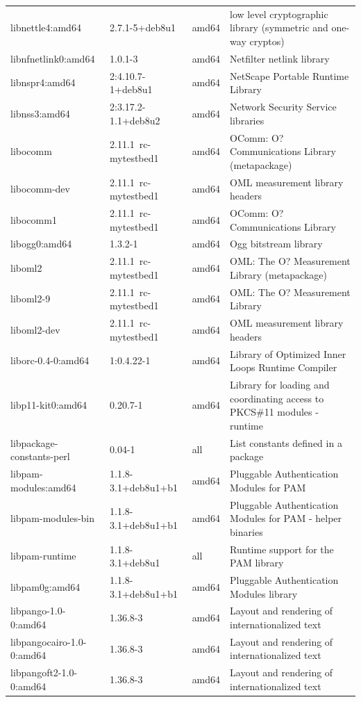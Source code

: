 \documentclass[a4paper,10pt]{article}
\begin{document}
\begin{appendices}
{\begin{longtable}{p{3.25cm}@{\hspace{0.25cm}}p{4cm}@{\hspace{0.25cm}}l@{\hspace{0.25cm}}p{7cm}}
libnettle4:amd64	&	2.7.1-5+deb8u1	&	amd64	&	low level cryptographic library (symmetric and one-way cryptos)	\\
libnfnetlink0:amd64	&	1.0.1-3	&	amd64	&	Netfilter netlink library	\\
libnspr4:amd64	&	2:4.10.7-1+deb8u1	&	amd64	&	NetScape Portable Runtime Library	\\
libnss3:amd64	&	2:3.17.2-1.1+deb8u2	&	amd64	&	Network Security Service libraries	\\
libocomm	&	2.11.1~rc-mytestbed1	&	amd64	&	OComm:  O? Communications Library (metapackage)	\\
libocomm-dev	&	2.11.1~rc-mytestbed1	&	amd64	&	OML measurement library headers	\\
libocomm1	&	2.11.1~rc-mytestbed1	&	amd64	&	OComm:  O? Communications Library	\\
libogg0:amd64	&	1.3.2-1	&	amd64	&	Ogg bitstream library	\\
liboml2	&	2.11.1~rc-mytestbed1	&	amd64	&	OML: The O? Measurement Library (metapackage)	\\
liboml2-9	&	2.11.1~rc-mytestbed1	&	amd64	&	OML: The O? Measurement Library	\\
liboml2-dev	&	2.11.1~rc-mytestbed1	&	amd64	&	OML measurement library headers	\\
liborc-0.4-0:amd64	&	1:0.4.22-1	&	amd64	&	Library of Optimized Inner Loops Runtime Compiler	\\
libp11-kit0:amd64	&	0.20.7-1	&	amd64	&	Library for loading and coordinating access to PKCS\#11 modules - runtime	\\
libpackage-constants-perl	&	0.04-1	&	all	&	List constants defined in a package	\\
libpam-modules:amd64	&	1.1.8-3.1+deb8u1+b1	&	amd64	&	Pluggable Authentication Modules for PAM	\\
libpam-modules-bin	&	1.1.8-3.1+deb8u1+b1	&	amd64	&	Pluggable Authentication Modules for PAM - helper binaries	\\
libpam-runtime	&	1.1.8-3.1+deb8u1	&	all	&	Runtime support for the PAM library	\\
libpam0g:amd64	&	1.1.8-3.1+deb8u1+b1	&	amd64	&	Pluggable Authentication Modules library	\\
libpango-1.0-0:amd64	&	1.36.8-3	&	amd64	&	Layout and rendering of internationalized text	\\
libpangocairo-1.0-0:amd64	&	1.36.8-3	&	amd64	&	Layout and rendering of internationalized text	\\
libpangoft2-1.0-0:amd64	&	1.36.8-3	&	amd64	&	Layout and rendering of internationalized text	\\

\end{longtable}}
\end{appendices}
\end{document}
